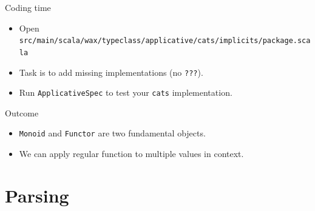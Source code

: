 \documentclass[presentation,aspectratio=169,smaller]{beamer}
\begin{document}
\begin{frame}[label={sec:org2c1ea3d},fragile]{Coding time}
 \begin{itemize}
\item Open \texttt{src/main/scala/wax/typeclass/applicative/cats/implicits/package.scala}
\item Task is to add missing implementations (no \texttt{???}).
\item Run \texttt{ApplicativeSpec} to test your \texttt{cats} implementation.
\end{itemize}
\end{frame}

\begin{frame}[label={sec:orgca48775},fragile]{Outcome}
 \begin{itemize}
\item <1-> \texttt{Monoid} and \texttt{Functor} are two fundamental objects.
\item <2-> We can apply regular function to multiple values in context.
\end{itemize}
\end{frame}

\section{Parsing}
\label{sec:org400802f}
\end{document}
